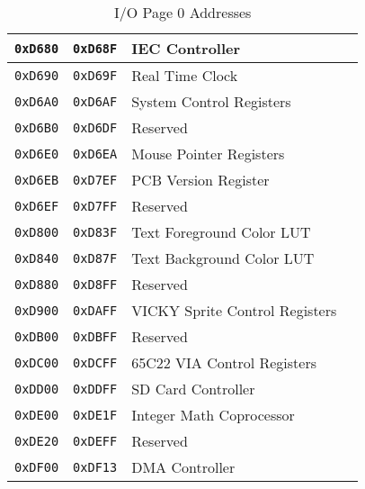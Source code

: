 \begin{table}[ht]
\begin{center}
\begin{tabular}{|c|c|l|l|}
            \verb+0xD680+ & \verb+0xD68F+ & IEC Controller & \pageref{tab:via_reg} \\ \hline
            \verb+0xD690+ & \verb+0xD69F+ & Real Time Clock & \pageref{tab:rtc_registers} \\ \hline
            \verb+0xD6A0+ & \verb+0xD6AF+ & System Control Registers & \pageref{sec:sysctrl} \\ \hline
            \verb+0xD6B0+ & \verb+0xD6DF+ & Reserved & \\ \hline
            \verb+0xD6E0+ & \verb+0xD6EA+ & Mouse Pointer Registers & \pageref{tab:mouse_reg} \\ \hline
            \verb+0xD6EB+ & \verb+0xD7EF+ & PCB Version Register & \pageref{tab:machine_id_ver} \\ \hline
            \verb+0xD6EF+ & \verb+0xD7FF+ & Reserved & \\ \hline
            \verb+0xD800+ & \verb+0xD83F+ & Text Foreground Color LUT & \multirow{2}{*}{\pageref{tab:text_luts}} \\ \cline{1-3}
            \verb+0xD840+ & \verb+0xD87F+ & Text Background Color LUT & \\ \hline
            \verb+0xD880+ & \verb+0xD8FF+ & Reserved & \\ \hline
            \verb+0xD900+ & \verb+0xDAFF+ & VICKY Sprite Control Registers & \pageref{tab:sp_reg} \\ \hline
            \verb+0xDB00+ & \verb+0xDBFF+ & Reserved & \\ \hline
            \verb+0xDC00+ & \verb+0xDCFF+ & 65C22 VIA Control Registers & \pageref{tab:via_reg}\\ \hline
            \verb+0xDD00+ & \verb+0xDDFF+ & SD Card Controller & \pageref{tab:ps2_reg} \\ \hline
            \verb+0xDE00+ & \verb+0xDE1F+ & Integer Math Coprocessor & \pageref{sec:int_math_copro} \\ \hline
            \verb+0xDE20+ & \verb+0xDEFF+ & Reserved & \\ \hline
            \verb+0xDF00+ & \verb+0xDF13+ & DMA Controller & \pageref{tab:dma_reg} \\ \hline
        \end{tabular}
        \caption{I/O Page 0 Addresses}
        \label{tab:io_page_0}
    \end{center}
\end{table}

